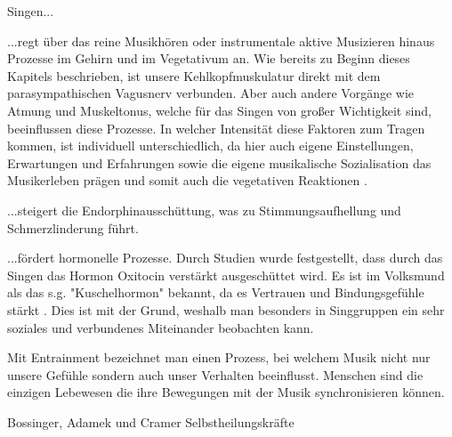 Singen...

...regt über das reine Musikhören oder instrumentale aktive Musizieren hinaus Prozesse im Gehirn und im Vegetativum an. Wie bereits zu Beginn dieses Kapitels beschrieben, ist unsere Kehlkopfmuskulatur direkt mit dem parasympathischen Vagusnerv verbunden. Aber auch andere Vorgänge wie Atmung und Muskeltonus, welche für das Singen von großer Wichtigkeit sind, beeinflussen diese Prozesse. In welcher Intensität diese Faktoren zum Tragen kommen, ist individuell unterschiedlich, da hier auch eigene Einstellungen, Erwartungen und Erfahrungen sowie die eigene musikalische Sozialisation das Musikerleben prägen und somit auch die vegetativen Reaktionen \autocite[vgl.][121]{bossinger2006}. 

...steigert die Endorphinausschüttung, was zu Stimmungsaufhellung und Schmerzlinderung führt.

...fördert hormonelle Prozesse. Durch Studien wurde festgestellt, dass durch das Singen das Hormon Oxitocin verstärkt ausgeschüttet wird. Es ist im Volksmund als das s.g. "Kuschelhormon" bekannt, da es Vertrauen und Bindungsgefühle stärkt \autocite[vgl.]{film}. Dies ist mit der Grund, weshalb man besonders in Singgruppen ein sehr soziales und verbundenes Miteinander beobachten kann.

Mit Entrainment bezeichnet man einen Prozess, bei welchem Musik nicht nur unsere Gefühle sondern auch unser Verhalten beeinflusst. Menschen sind die einzigen Lebewesen die ihre Bewegungen mit der Musik synchronisieren können.

Bossinger, Adamek und Cramer
Selbstheilungskräfte



\newpage\thispagestyle{empty}
